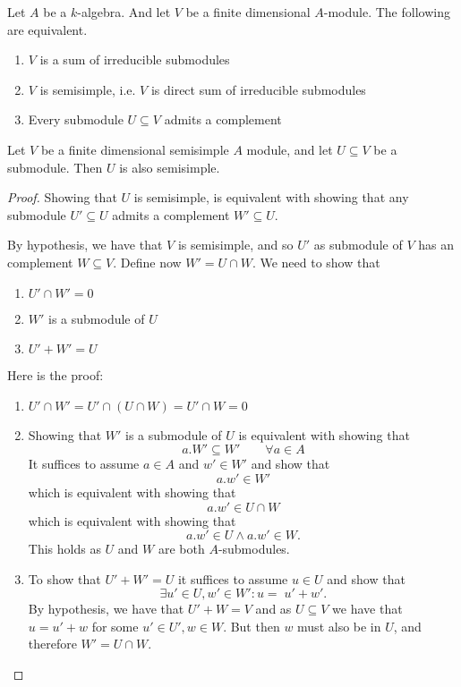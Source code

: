 \begin{prop}
Let \(A\) be a \(k\)-algebra. And let \(V\) be a finite dimensional \(A\)-module. The following are equivalent.

\begin{enumerate}
  \item \(V\) is a sum of irreducible submodules
  \item \(V\) is semisimple, i.e. \(V\) is direct sum of irreducible submodules
  \item Every submodule \(U\subseteq V\) admits a complement
\end{enumerate}
\end{prop}

\begin{prop}
Let \(V\) be a finite dimensional semisimple \(A\) module, and let \(U\subseteq V\) be a submodule. Then \(U\) is also semisimple.
\end{prop}

\begin{proof}
Showing that \(U\) is semisimple, is equivalent with showing that any submodule \(U'\subseteq U\) admits a complement \(W'\subseteq U\).

By hypothesis, we have that \(V\) is semisimple, and so \(U'\) as submodule of \(V\) has an complement \(W\subseteq V.\) Define now \(W'=U\cap W.\) We need to show that

\begin{enumerate}
  \item \(U'\cap W'=0\)
  \item \(W'\) is a submodule of \(U\)
  \item \(U'+W'=U\)
\end{enumerate}

Here is the proof:

\begin{enumerate}
  \item \(U'\cap W'=U'\cap (U\cap W)=U'\cap W=0\)
  \item Showing that \(W'\) is a submodule of \(U\) is equivalent with showing that
\[
a.W'\subseteq W' \qquad \forall a\in A
\]
It suffices to assume \(a\in A\) and \(w'\in W'\) and show that
\[
a.w'\in W'
\]
which is equivalent with showing that
\[
a.w'\in U\cap W
\]
which is equivalent with showing that
\[
a.w'\in U \wedge  a.w'\in W.
\]
This holds as \(U\) and \(W\) are both \(A\)-submodules.
  \item To show that \(U'+W'=U\) it suffices to assume \(u\in U\) and show that
\[
\exists u'\in U,w'\in W' : u=\; u'+w'.
\]
By hypothesis, we have that \(U'+W=V\) and as \(U\subseteq V\) we have that \(u=u'+w\) for some \(u'\in U',w\in W\). But then \(w\) must also be in \(U\), and therefore \(W'=U\cap W\).
\end{enumerate}
\end{proof}

